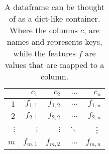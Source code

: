 \begin{table}[ht]
    \centering
    \begin{tabular}{ r | r r r r }
        \hline
                    & $c_1$     & $c_2$     & $\dots$   & $c_n$     \\
        \hline
        $1$         & $f_{1,1}$ & $f_{1,2}$ & $\dots$   & $f_{1,n}$ \\
        $2$         & $f_{2,1}$ & $f_{2,2}$ & $\dots$   & $f_{2,n}$ \\
        $\vdots$    & $\vdots$  & $\vdots$  & $\ddots$  & \vdots    \\
        $m$         & $f_{m,1}$ & $f_{m,2}$ & $\dots$   & $f_{m,n}$ \\
        \hline
    \end{tabular}
    \caption[Structure - Dataframe ]{A dataframe can be thought of as a dict-like container. Where the columns $c$, are names and represents keys, while the features $f$ are values that are mapped to a column.}
    \label{tab:dataframe}
\end{table}